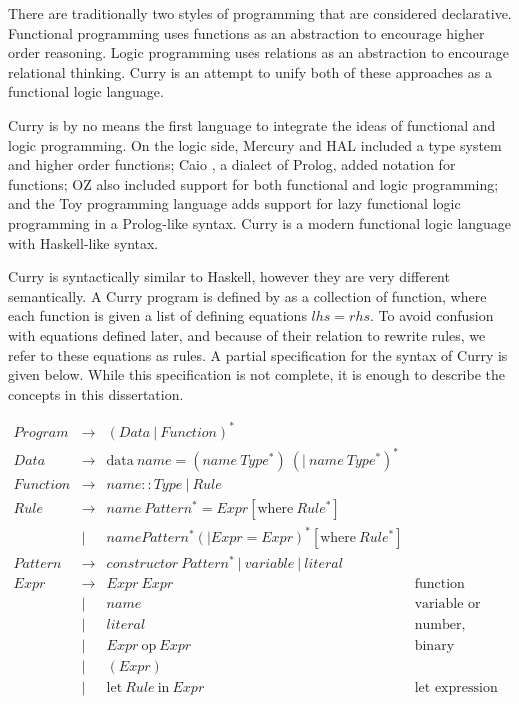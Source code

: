 
There are traditionally two styles of programming that are considered declarative.
Functional programming uses functions as an abstraction to encourage higher order reasoning.
Logic programming uses relations as an abstraction to encourage relational thinking.
Curry is an attempt to unify both of these approaches as a functional logic language.

Curry is by no means the first language to integrate the ideas of functional and logic programming.
On the logic side, Mercury \cite{mercury} and HAL \cite{hal} included a type system and higher order functions;
Caio \cite{caio}, a dialect of Prolog, added notation for functions;
OZ \cite{oz} also included support for both functional and logic programming;
and the Toy programming language \cite{toy} adds support for lazy functional logic programming in a Prolog-like syntax.
Curry \cite{Hanus16Curry} is a modern functional logic language with Haskell-like syntax.

Curry is syntactically similar to Haskell, however they are very different semantically.
A Curry program is defined by as a collection of function, where each function is given a list of defining equations $lhs = rhs$.
To avoid confusion with equations defined later, and because of their relation to rewrite rules, we refer to these equations as rules.
A partial specification for the syntax of Curry is given below.
While this specification is not complete, it is enough to describe the concepts in this dissertation.

$$\begin{array}{llll}
Program  & \to & (Data\ |\ Function)^* \\
Data     & \to & \text{data}\ name = (name\ Type^*)\ (|\ name\ Type^*)^* \\
Function & \to & name :: Type\ |\ Rule  \\
Rule     & \to & name\ Pattern^* = Expr [\text{where}\ Rule^*] \\
         & |   & name Pattern^* (| Expr = Expr )^* [\text{where}\ Rule^*] \\
Pattern  & \to & constructor\ Pattern^*\ |\ variable\ |\ literal \\
Expr     & \to & Expr\ Expr             & \text{function application}\\
         & |   & name                  & \text{variable or function}\\
         & |   & literal               & \text{number, boolean, or character}\\
         & |   & Expr\ \text{op}\ Expr & \text{binary operation}\\
         & |   & ( Expr )              & \\
         & |   & \text{let}\ Rule\ \text{in}\ Expr  & \text{let expression}
\end{array}$$

